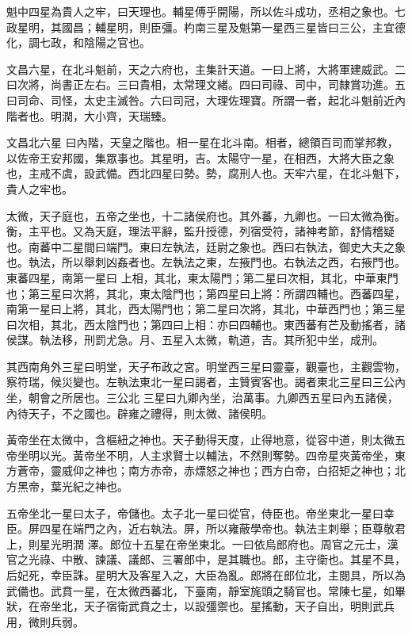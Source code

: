 \begin{pinyinscope}
{{ 魁中四星為貴人之牢，曰天理也。輔星傅乎開陽，所以佐斗成功，丞相之象也。七政星明，其國昌；輔星明，則臣彊。杓南三星及魁第一星西三星皆曰三公，主宜德化，調七政，和陰陽之官也。



 文昌六星，在北斗魁前，天之六府也，主集計天道。一曰上將，大將軍建威武。二曰次將，尚書正左右。三曰貴相，太常理文緒。四曰司祿、司中，司隸賞功進。五曰司命、司怪，太史主滅咎。六曰司冠，大理佐理寶。所謂一者，起北斗魁前近內階者也。明潤，大小齊，天瑞臻。



 文昌北六星
 曰內階，天皇之階也。相一星在北斗南。相者，總領百司而掌邦教，以佐帝王安邦國，集眾事也。其星明，吉。太陽守一星，在相西，大將大臣之象也，主戒不虞，設武備。西北四星曰勢。勢，腐刑人也。天牢六星，在北斗魁下，貴人之牢也。



 太微，天子庭也，五帝之坐也，十二諸侯府也。其外蕃，九卿也。一曰太微為衡。衡，主平也。又為天庭，理法平辭，監升授德，列宿受符，諸神考節，舒情稽疑也。南蕃中二星間曰端門。東曰左執法，廷尉之象也。西曰右執法，御史大夫之象也。執法，所以舉刺凶姦者也。左執法之東，左掖門也。右執法之西，右掖門也。東蕃四星，南第一星曰
 上相，其北，東太陽門；第二星曰次相，其北，中華東門也；第三星曰次將，其北，東太陰門也；第四星曰上將：所謂四輔也。西蕃四星，南第一星曰上將，其北，西太陽門也；第二星曰次將，其北，中華西門也；第三星曰次相，其北，西太陰門也；第四曰上相：亦曰四輔也。東西蕃有芒及動搖者，諸侯謀。執法移，刑罰尤急。月、五星入太微，軌道，吉。其所犯中坐，成刑。



 其西南角外三星曰明堂，天子布政之宮。明堂西三星曰靈臺，觀臺也，主觀雲物，察符瑞，候災變也。左執法東北一星曰謁者，主贊賓客也。謁者東北三星曰三公內坐，朝會之所居也。三公北
 三星曰九卿內坐，治萬事。九卿西五星曰內五諸侯，內待天子，不之國也。辟雍之禮得，則太微、諸侯明。



 黃帝坐在太微中，含樞紐之神也。天子動得天度，止得地意，從容中道，則太微五帝坐明以光。黃帝坐不明，人主求賢士以輔法，不然則奪勢。四帝星夾黃帝坐，東方蒼帝，靈威仰之神也；南方赤帝，赤熛怒之神也；西方白帝，白招矩之神也；北方黑帝，葉光紀之神也。



 五帝坐北一星曰太子，帝儲也。太子北一星曰從官，侍臣也。帝坐東北一星曰幸臣。屏四星在端門之內，近右執法。屏，所以雍蔽學帝也。執法主刺舉；臣尊敬君上，則星光明潤
 澤。郎位十五星在帝坐東北。一曰依烏郎府也。周官之元士，漢官之光祿、中散、諫議、議郎、三署郎中，是其職也。郎，主守衛也。其星不具，后妃死，幸臣誅。星明大及客星入之，大臣為亂。郎將在郎位北，主閱具，所以為武備也。武賁一星，在太微西蕃北，下臺南，靜室旄頭之騎官也。常陳七星，如畢狀，在帝坐北，天子宿衛武賁之士，以設彊禦也。星搖動，天子自出，明則武兵用，微則兵弱。



}}
\end{pinyinscope}
